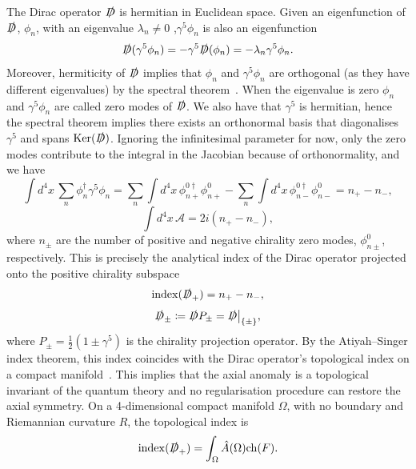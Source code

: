 \documentclass[11pt, a4paper]{article}
\begin{document}
The Dirac operator $\slashed{D}$ is hermitian in Euclidean space.
Given an eigenfunction of $\slashed{D}$, $\phi_n$, with an eigenvalue $\lambda_n \neq 0$ 
,$\gamma^5\phi_n$ is also an eigenfunction
\begin{equation}
  \slashed{D}(\gamma^5\phi_n) = -\gamma^5\slashed{D}(\phi_n) = -\lambda_n\gamma^5\phi_n.
\end{equation}
Moreover, hermiticity of $\slashed{D}$ implies that $\phi_n$ and $\gamma^5\phi_n$
are orthogonal (as they have different eigenvalues) by the
spectral theorem~\cite{Spectral}.
When the eigenvalue is zero $\phi_n$ and $\gamma^5\phi_n$
are called zero modes of $\slashed{D}$. We also have that $\gamma^5$ is 
hermitian, hence the spectral theorem implies there exists an orthonormal
basis that diagonalises $\gamma^5$ and spans $\mathrm{Ker}(\slashed{D})$.
Ignoring the infinitesimal parameter for now, only the zero modes contribute
to the integral in the Jacobian because of orthonormality, and we have
\begin{equation}
  \int{d^4x\, \sum_n{\phi^\dagger_n\gamma^5\phi_n}}
  = \sum_n{\int{d^4x\,\phi^{0\dagger}_{n+}\phi^0_{n+}}}
  -\sum_n{\int{d^4x\,\phi^{0\dagger}_{n-}\phi^0_{n-}}} = n_+ - n_-,
\end{equation}
\begin{equation}
  \int{d^4x\, \mathcal{A}} = 2i(n_+ - n_-),
\end{equation}
where $n_\pm$ are the number of positive and negative chirality zero modes, $\phi^0_{n\pm}$,
respectively. This is precisely the analytical index of the Dirac operator 
projected onto the positive chirality subspace
\begin{equation}
  \mathrm{index}(\slashed{D}_{+}) = n_+ - n_-, 
\end{equation}
\begin{equation}
  \slashed{D}_\pm \coloneq \slashed{D}P_{\pm} = \slashed{D}\big|_{\{\pm\}},
\end{equation}
where $P_{\pm} = \frac{1}{2}(1 \pm \gamma^5)$ is the chirality
projection operator.
By the Atiyah–Singer index theorem, this index coincides with the Dirac operator's 
topological index on a compact manifold~\cite{Atiyah-Singer}.
This implies that the axial anomaly is a topological invariant of the quantum theory
and no regularisation procedure can restore the axial symmetry.
On a 4-dimensional compact manifold $\Omega$, with no boundary and
Riemannian curvature $R$, the topological index is~\cite{AST-Alvarez-Gaume,DiffGeomGauge}
\begin{equation}
  \mathrm{index}(\slashed{D}_+ ) =  \int_{\Omega}{\hat{A}(\Omega)\mathrm{ch}(F)}.
\end{equation}
\end{document}
